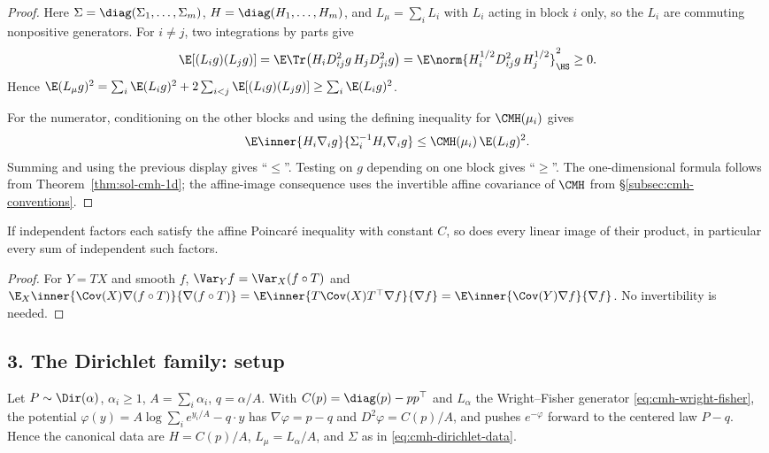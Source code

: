 \documentclass[../main.tex]{subfiles}
\begin{document}
\begin{proof}
Here $\Sigma=\diag(\Sigma_1,\dots,\Sigma_m)$, $H=\diag(H_1,\dots,H_m)$, and
$L_\mu=\sum_iL_i$ with $L_i$ acting in block $i$ only, so the $L_i$ are commuting nonpositive
generators. For $i\ne j$, two integrations by parts give
\[
  \E[(L_ig)(L_jg)]
  =\E\Tr\!\left(H_iD^2_{ij}g\,H_jD^2_{ji}g\right)
  =\E\norm{H_i^{1/2}D^2_{ij}g\,H_j^{1/2}}_{\HS}^2\ge0.
\]
Hence
$\E(L_\mu g)^2=\sum_i\E(L_ig)^2+2\sum_{i<j}\E[(L_ig)(L_jg)]\ge\sum_i\E(L_ig)^2$.

For the numerator, conditioning on the other blocks and using the defining inequality for
$\CMH(\mu_i)$ gives
\[
  \E\inner{H_i\nabla_i g}{\Sigma_i^{-1}H_i\nabla_i g}
  \le\CMH(\mu_i)\,\E(L_i g)^2.
\]
Summing and using the previous display gives ``$\le$''. Testing on $g$ depending on one block
gives ``$\ge$''. The one-dimensional formula follows from Theorem~\ref{thm:sol-cmh-1d}; the
affine-image consequence uses the invertible affine covariance of $\CMH$ from
\S\ref{subsec:cmh-conventions}.
\end{proof}

\begin{corollary}[= Corollary~\ref{cor:cmh-linear-images}]
\label{cor:sol-cmh-linear-images}
If independent factors each satisfy the affine Poincar\'e inequality with constant $C$, so does
every linear image of their product, in particular every sum of independent such factors.
\end{corollary}

\begin{proof}
For $Y=TX$ and smooth $f$, $\Var_Yf=\Var_X(f\circ T)$ and
$\E_X\inner{\Cov(X)\nabla(f\circ T)}{\nabla(f\circ T)}
=\E\inner{T\Cov(X)T^\top\nabla f}{\nabla f}=\E\inner{\Cov(Y)\nabla f}{\nabla f}$. No
invertibility is needed.
\end{proof}

\subsection*{3. The Dirichlet family: setup}

Let $P\sim\Dir(\alpha)$, $\alpha_i\ge1$, $A=\sum_i\alpha_i$, $q=\alpha/A$. With
$C(p)=\diag(p)-pp^\top$ and $L_\alpha$ the Wright--Fisher generator
\eqref{eq:cmh-wright-fisher}, the potential
$\varphi(y)=A\log\sum_ie^{y_i/A}-q\cdot y$ has $\nabla\varphi=p-q$ and $D^2\varphi=C(p)/A$, and
pushes $e^{-\varphi}$ forward to the centered law $P-q$. Hence the canonical data are
$H=C(p)/A$, $L_\mu=L_\alpha/A$, and $\Sigma$ as in \eqref{eq:cmh-dirichlet-data}.
\end{document}
